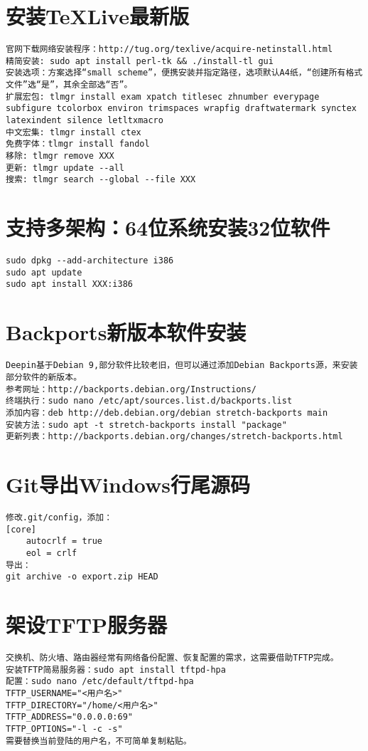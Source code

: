 \documentclass[a4paper,fontset=fandol,zihao=-4,linespread=1.2,oneside]{ctexbook}
\begin{document}
\section{安装TeXLive最新版}
\begin{lstlisting}
官网下载网络安装程序：http://tug.org/texlive/acquire-netinstall.html
精简安装: sudo apt install perl-tk && ./install-tl gui
安装选项：方案选择“small scheme”，便携安装并指定路径，选项默认A4纸，“创建所有格式文件”选“是”，其余全部选“否”。
扩展宏包: tlmgr install exam xpatch titlesec zhnumber everypage subfigure tcolorbox environ trimspaces wrapfig draftwatermark synctex latexindent silence letltxmacro
中文宏集: tlmgr install ctex
免费字体：tlmgr install fandol
移除: tlmgr remove XXX
更新: tlmgr update --all
搜索: tlmgr search --global --file XXX
\end{lstlisting}

\section{支持多架构：64位系统安装32位软件}
\begin{lstlisting}
sudo dpkg --add-architecture i386
sudo apt update
sudo apt install XXX:i386
\end{lstlisting}

\section{Backports新版本软件安装}
\begin{lstlisting}
Deepin基于Debian 9,部分软件比较老旧，但可以通过添加Debian Backports源，来安装部分软件的新版本。
参考网址：http://backports.debian.org/Instructions/
终端执行：sudo nano /etc/apt/sources.list.d/backports.list
添加内容：deb http://deb.debian.org/debian stretch-backports main
安装方法：sudo apt -t stretch-backports install "package"
更新列表：http://backports.debian.org/changes/stretch-backports.html
\end{lstlisting}

\section{Git导出Windows行尾源码}
\begin{lstlisting}
修改.git/config，添加：
[core]
	autocrlf = true
	eol = crlf
导出：
git archive -o export.zip HEAD
\end{lstlisting}

\section{架设TFTP服务器}
\begin{lstlisting}
交换机、防火墙、路由器经常有网络备份配置、恢复配置的需求，这需要借助TFTP完成。
安装TFTP简易服务器：sudo apt install tftpd-hpa
配置：sudo nano /etc/default/tftpd-hpa
TFTP_USERNAME="<用户名>"
TFTP_DIRECTORY="/home/<用户名>"
TFTP_ADDRESS="0.0.0.0:69"
TFTP_OPTIONS="-l -c -s"
需要替换当前登陆的用户名，不可简单复制粘贴。
\end{lstlisting}
\end{document}
